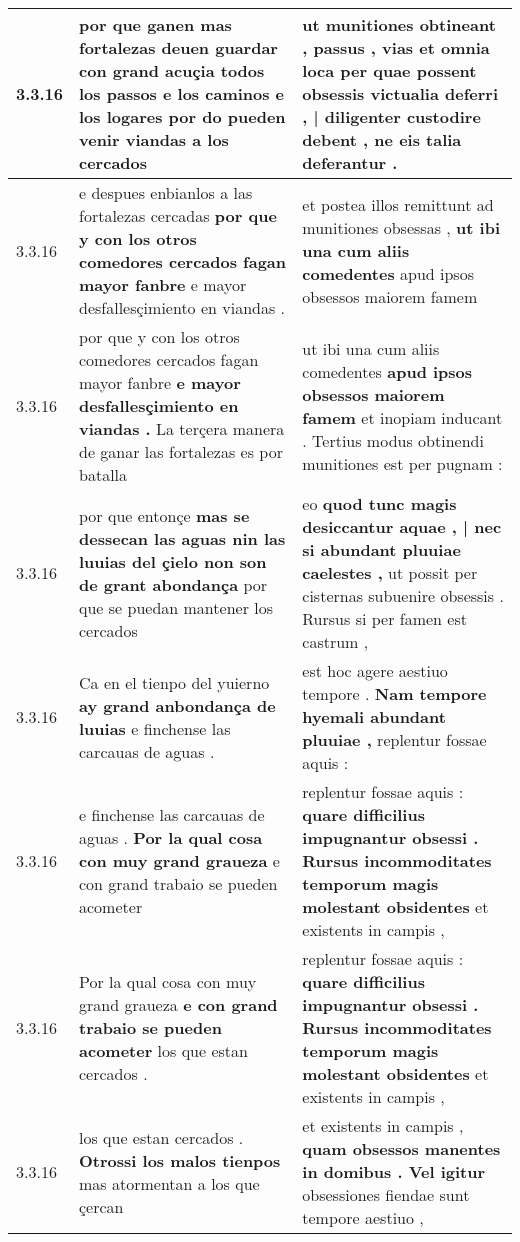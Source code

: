 \begin{tabular}{|p{1cm}|p{6.5cm}|p{6.5cm}|}
3.3.16 & por que ganen mas fortalezas \textbf{ deuen guardar con grand acuçia todos los passos e los caminos e los logares } por do pueden venir viandas a los cercados & ut munitiones obtineant , passus , vias \textbf{ et omnia loca per quae possent obsessis victualia deferri , | diligenter custodire debent , } ne eis talia deferantur . \\\hline
3.3.16 & e despues enbianlos a las fortalezas cercadas \textbf{ por que y con los otros comedores cercados fagan mayor fanbre } e mayor desfallesçimiento en viandas . & et postea illos remittunt ad munitiones obsessas , \textbf{ ut ibi una cum aliis comedentes } apud ipsos obsessos maiorem famem \\\hline
3.3.16 & por que y con los otros comedores cercados fagan mayor fanbre \textbf{ e mayor desfallesçimiento en viandas . } La terçera manera de ganar las fortalezas es por batalla & ut ibi una cum aliis comedentes \textbf{ apud ipsos obsessos maiorem famem } et inopiam inducant . Tertius modus obtinendi munitiones est per pugnam : \\\hline
3.3.16 & por que entonçe \textbf{ mas se dessecan las aguas nin las luuias del çielo non son de grant abondança } por que se puedan mantener los cercados & eo \textbf{ quod tunc magis desiccantur aquae , | nec si abundant pluuiae caelestes , } ut possit per cisternas subuenire obsessis . Rursus si per famen est castrum , \\\hline
3.3.16 & Ca en el tienpo del yuierno \textbf{ ay grand anbondança de luuias } e finchense las carcauas de aguas . & est hoc agere aestiuo tempore . \textbf{ Nam tempore hyemali abundant pluuiae , } replentur fossae aquis : \\\hline
3.3.16 & e finchense las carcauas de aguas . \textbf{ Por la qual cosa con muy grand graueza } e con grand trabaio se pueden acometer & replentur fossae aquis : \textbf{ quare difficilius impugnantur obsessi . Rursus incommoditates temporum magis molestant obsidentes } et existents in campis , \\\hline
3.3.16 & Por la qual cosa con muy grand graueza \textbf{ e con grand trabaio se pueden acometer } los que estan cercados . & replentur fossae aquis : \textbf{ quare difficilius impugnantur obsessi . Rursus incommoditates temporum magis molestant obsidentes } et existents in campis , \\\hline
3.3.16 & los que estan cercados . \textbf{ Otrossi los malos tienpos } mas atormentan a los que çercan & et existents in campis , \textbf{ quam obsessos manentes in domibus . Vel igitur } obsessiones fiendae sunt tempore aestiuo , \\\hline

\end{tabular}
